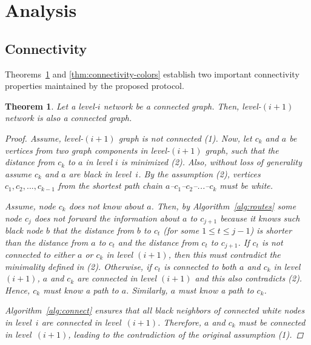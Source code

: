 \documentclass[conference]{IEEEtran}
\newtheorem{thm}{Theorem}
\theoremstyle{definition}
\begin{document}
\section{Analysis}
\label{sec:analysis}

\subsection{Connectivity}
\label{sec:analysis:connectivity}

Theorems~\ref{thm:connectivity-levels} and \ref{thm:connectivity-colors} establish 
two important connectivity properties maintained by the proposed protocol.

\begin{thm}
    Let a level-$i$ network be a connected graph. Then, level-$(i+1)$ network is also a connected graph.

    \begin{proof}
        Assume, level-$(i+1)$ graph is not connected (1). Now, let $c_k$ and $a$ be vertices from two graph components in level-$(i+1)$ graph, such that the distance from $c_k$ to $a$ in level $i$ is minimized (2). Also, without loss of generality assume $c_k$ and $a$ are black in level~$i$. By the assumption (2), vertices $c_1,c_2,...,c_{k-1}$ from the shortest path chain $a$--$c_1$--$c_2$--...--$c_k$ must be white.

        Assume, node $c_k$ does not know about $a$. Then, by Algorithm~\ref{alg:routes} some node $c_j$ does not forward the information about $a$ to $c_{j+1}$ because it knows such black node $b$ that the distance from $b$ to $c_t$ (for some $1 \le t \le j - 1$) is shorter than the distance from $a$ to $c_t$ and the distance from $c_t$ to $c_{j+1}$. If $c_t$ is not connected to either $a$ or $c_k$ in level $(i+1)$, then this must contradict the minimality defined in (2). Otherwise, if $c_t$ is connected to both $a$ and $c_k$ in level $(i+1)$, $a$ and $c_k$ are connected in level $(i+1)$ and this also contradicts (2). Hence, $c_k$ must know a path to $a$. Similarly, $a$ must know a path to $c_k$.

        Algorithm~\ref{alg:connect} ensures that all black neighbors of connected white nodes in level~$i$ are connected in level~$(i+1)$. Therefore, $a$ and $c_k$ must be connected in level~$(i+1)$, leading to the contradiction of the original assumption (1).
    \end{proof}

    \label{thm:connectivity-levels}
\end{thm}
\end{document}
